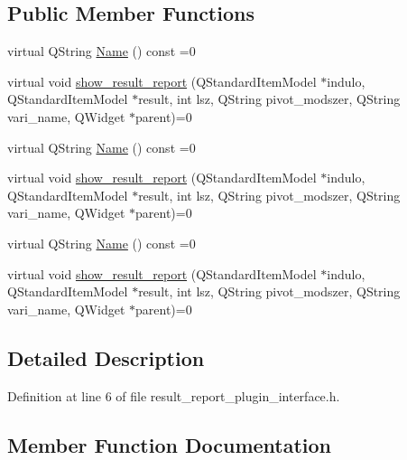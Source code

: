 \subsection*{Public Member Functions}
\begin{DoxyCompactItemize}
\item 
virtual Q\+String \hyperlink{classResult__Report__Plugin__Interface_ad86b327f9bebee3f52666abeea1ca03f}{Name} () const =0
\item 
virtual void \hyperlink{classResult__Report__Plugin__Interface_a7dc45f2c25e0f4f4f99b2d7cd1799aa0}{show\+\_\+result\+\_\+report} (Q\+Standard\+Item\+Model $\ast$indulo, Q\+Standard\+Item\+Model $\ast$result, int lsz, Q\+String pivot\+\_\+modszer, Q\+String vari\+\_\+name, Q\+Widget $\ast$parent)=0
\item 
virtual Q\+String \hyperlink{classResult__Report__Plugin__Interface_ad86b327f9bebee3f52666abeea1ca03f}{Name} () const =0
\item 
virtual void \hyperlink{classResult__Report__Plugin__Interface_a7dc45f2c25e0f4f4f99b2d7cd1799aa0}{show\+\_\+result\+\_\+report} (Q\+Standard\+Item\+Model $\ast$indulo, Q\+Standard\+Item\+Model $\ast$result, int lsz, Q\+String pivot\+\_\+modszer, Q\+String vari\+\_\+name, Q\+Widget $\ast$parent)=0
\item 
virtual Q\+String \hyperlink{classResult__Report__Plugin__Interface_ad86b327f9bebee3f52666abeea1ca03f}{Name} () const =0
\item 
virtual void \hyperlink{classResult__Report__Plugin__Interface_a7dc45f2c25e0f4f4f99b2d7cd1799aa0}{show\+\_\+result\+\_\+report} (Q\+Standard\+Item\+Model $\ast$indulo, Q\+Standard\+Item\+Model $\ast$result, int lsz, Q\+String pivot\+\_\+modszer, Q\+String vari\+\_\+name, Q\+Widget $\ast$parent)=0
\end{DoxyCompactItemize}


\subsection{Detailed Description}


Definition at line 6 of file result\+\_\+report\+\_\+plugin\+\_\+interface.\+h.



\subsection{Member Function Documentation}
\mbox{\label{classResult__Report__Plugin__Interface_ad86b327f9bebee3f52666abeea1ca03f}} 
